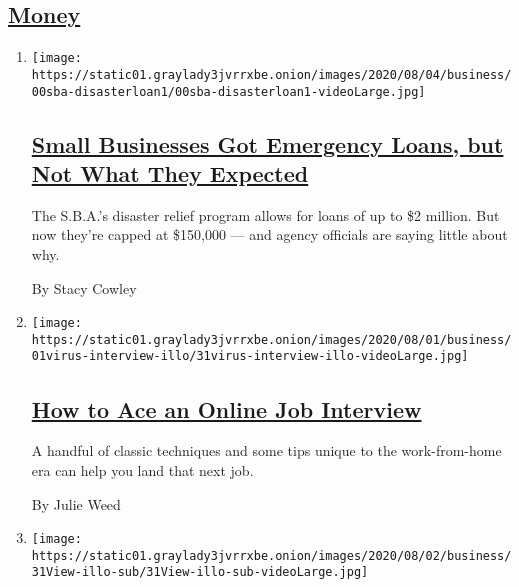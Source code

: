 \hypertarget{money}{%
\subsection{\texorpdfstring{\protect\hyperlink{}{Money}}{Money}}\label{money}}

\begin{enumerate}
\def\labelenumi{\arabic{enumi}.}
\item
  \texttt{[image: https://static01.graylady3jvrrxbe.onion/images/2020/08/04/business/00sba-disasterloan1/00sba-disasterloan1-videoLarge.jpg]}

  \hypertarget{small-businesses-got-emergency-loans-but-not-what-they-expected}{%
  \subsection{\texorpdfstring{\href{/2020/08/03/business/small-business-loans-coronavirus.html}{Small
  Businesses Got Emergency Loans, but Not What They
  Expected}}{Small Businesses Got Emergency Loans, but Not What They Expected}}\label{small-businesses-got-emergency-loans-but-not-what-they-expected}}

  The S.B.A.'s disaster relief program allows for loans of up to \$2
  million. But now they're capped at \$150,000 --- and agency officials
  are saying little about why.

  By Stacy Cowley
\item
  \texttt{[image: https://static01.graylady3jvrrxbe.onion/images/2020/08/01/business/01virus-interview-illo/31virus-interview-illo-videoLarge.jpg]}

  \hypertarget{how-to-ace-an-online-job-interview}{%
  \subsection{\texorpdfstring{\href{/2020/08/03/business/online-job-interview-tips.html}{How
  to Ace an Online Job
  Interview}}{How to Ace an Online Job Interview}}\label{how-to-ace-an-online-job-interview}}

  A handful of classic techniques and some tips unique to the
  work-from-home era can help you land that next job.

  By Julie Weed
\item
  \texttt{[image: https://static01.graylady3jvrrxbe.onion/images/2020/08/02/business/31View-illo-sub/31View-illo-sub-videoLarge.jpg]}

  \hypertarget{how-to-navigate-the-coronavirus-real-estate-market}{%
}
\end{enumerate}
